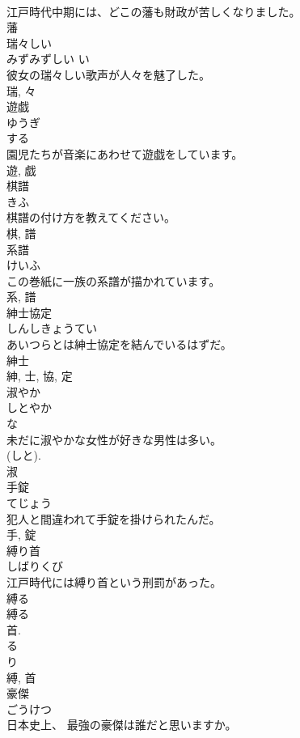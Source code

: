 \documentclass[8pt]{extreport}
\begin{document}
\begin{CJK}{UTF8}{min}
\\	江戸時代中期には、どこの藩も財政が苦しくなりました。	
\\	藩	
\\	瑞々しい	
\\	みずみずしい	い 
\\	彼女の瑞々しい歌声が人々を魅了した。	
\\	瑞, 々	
\\	遊戯	
\\	ゆうぎ	
\\	する 
\\	園児たちが音楽にあわせて遊戯をしています。	
\\	遊, 戯	
\\	棋譜	
\\	きふ	
\\	棋譜の付け方を教えてください。	
\\	棋, 譜	
\\	系譜	
\\	けいふ	
\\	この巻紙に一族の系譜が描かれています。	
\\	系, 譜	
\\	紳士協定	
\\	しんしきょうてい	
\\	あいつらとは紳士協定を結んでいるはずだ。	
\\	紳士 
\\	紳, 士, 協, 定	
\\	淑やか	
\\	しとやか	
\\	な 
\\	未だに淑やかな女性が好きな男性は多い。	
\\	(しと). 
\\	淑	
\\	手錠	
\\	てじょう	
\\	犯人と間違われて手錠を掛けられたんだ。	
\\	手, 錠	
\\	縛り首	
\\	しばりくび	
\\	江戸時代には縛り首という刑罰があった。	
\\	縛る 
\\	縛る 
\\	首. 
\\	る 
\\	り 
\\	縛, 首	
\\	豪傑	
\\	ごうけつ	
\\	日本史上、 最強の豪傑は誰だと思いますか。	

\end{CJK}
\end{document}
